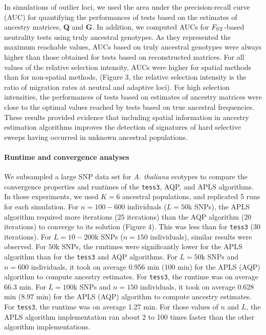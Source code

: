In simulations of outlier loci, we used the area under the precision-recall curve (AUC) for quantifying the performances of tests based on the estimates of ancestry matrices, {\bf Q} and {\bf G}. In addition, we computed AUCs for $F_{\rm ST}$-based neutrality tests using truly ancestral genotypes. As they represented the maximum reachable values, AUCs based on truly ancestral genotypes were always higher than those obtained for tests based on reconstructed matrices. For all values of the relative  selection intensity, AUCs were higher for spatial methods than for non-spatial methods, (Figure 3, the relative selection intensity is the ratio of migration rates at neutral and adaptive loci). For high selection intensities, the performances of tests based on estimates of ancestry matrices were close to the optimal values reached  by tests based on true ancestral frequencies. These results provided evidence that including spatial information in ancestry estimation algorithms improves the detection of signatures of hard selective sweeps having occurred in unknown ancestral populations. 

\paragraph{Runtime and convergence analyses} We subsampled a large SNP data set for {\it A. thaliana} ecotypes  to compare the convergence properties and runtimes of the {\tt tess3}, AQP, and APLS algorithms. In those experiments, we used $K = 6$ ancestral populations, and replicated 5 runs for each simulation. For $n = 100-600$ individuals ($L = 50$k SNPs), the APLS algorithm required more iterations (25 iterations)  than the AQP algorithm (20 iterations) to converge to its solution  (Figure 4). This was less than for {\tt tess3} (30 iterations).  For $L = 10-200$k SNPs ($n = 150$ individuals), similar results were observed. For $50$k SNPs, the runtimes were significantly lower for the APLS algorithm than for the {\tt tess3} and AQP algorithms. For $L = 50$k SNPs and $n = 600$ individuals, it took on average 0.956 min (100 min) for the APLS (AQP) algorithm to compute ancestry estimates. For {\tt tess3}, the runtime was on average 66.3 min. For $L = 100$k SNPs and $n = 150$ individuals, it took on average 0.628 min (8.97 min) for the APLS (AQP) algorithm to compute ancestry estimates. For {\tt tess3}, the runtime was on average 1.27 min.  For those values of $n$ and $L$, the APLS algorithm implementation ran about 2 to 100 times faster than the other algorithm implementations.
 
